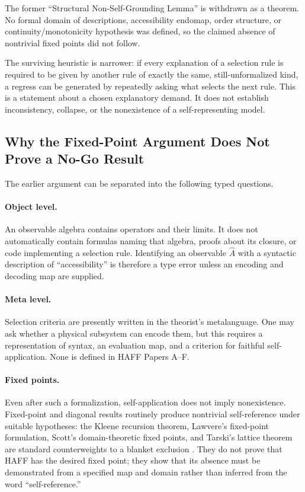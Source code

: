 \documentclass[12pt,a4paper]{article}
\begin{document}
The former ``Structural Non-Self-Grounding Lemma'' is withdrawn as a theorem.  No formal domain of descriptions, accessibility endomap, order structure, or continuity/monotonicity hypothesis was defined, so the claimed absence of nontrivial fixed points did not follow.

The surviving heuristic is narrower: if every explanation of a selection rule is required to be given by another rule of exactly the same, still-unformalized kind, a regress can be generated by repeatedly asking what selects the next rule.  This is a statement about a chosen explanatory demand.  It does not establish inconsistency, collapse, or the nonexistence of a self-representing model.

\subsection{Why the Fixed-Point Argument Does Not Prove a No-Go Result}

The earlier argument can be separated into the following typed questions.

\paragraph{Object level.}
An observable algebra contains operators and their limits.  It does not automatically contain formulas naming that algebra, proofs about its closure, or code implementing a selection rule.  Identifying an observable $\hat A$ with a syntactic description of ``accessibility'' is therefore a type error unless an encoding and decoding map are supplied.

\paragraph{Meta level.}
Selection criteria are presently written in the theorist's metalanguage.  One may ask whether a physical subsystem can encode them, but this requires a representation of syntax, an evaluation map, and a criterion for faithful self-application.  None is defined in HAFF Papers A--F.

\paragraph{Fixed points.}
Even after such a formalization, self-application does not imply nonexistence.  Fixed-point and diagonal results routinely produce nontrivial self-reference under suitable hypotheses: the Kleene recursion theorem, Lawvere's fixed-point formulation, Scott's domain-theoretic fixed points, and Tarski's lattice theorem are standard counterweights to a blanket exclusion \cite{Kleene1952,Lawvere1969,Scott1972,Tarski1955}.  They do not prove that HAFF has the desired fixed point; they show that its absence must be demonstrated from a specified map and domain rather than inferred from the word ``self-reference.''
\end{document}
